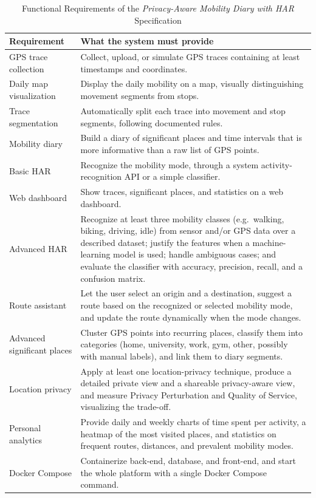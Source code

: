 \documentclass[conference,a4paper]{IEEEtran}
\begin{document}
\begin{table}[htbp]
\caption{Functional Requirements of the \textit{Privacy-Aware Mobility Diary with HAR} Specification}
\begin{center}
\begin{tabularx}{\textwidth}{p{} X}
\toprule
\textbf{Requirement} & \textbf{What the system must provide}\\
\midrule
GPS trace collection & Collect, upload, or simulate GPS traces containing at least timestamps and coordinates.\\
Daily map visualization & Display the daily mobility on a map, visually distinguishing movement segments from stops.\\
Trace segmentation & Automatically split each trace into movement and stop segments, following documented rules.\\
Mobility diary & Build a diary of significant places and time intervals that is more informative than a raw list of GPS points.\\
Basic HAR & Recognize the mobility mode, through a system activity-recognition API or a simple classifier.\\
Web dashboard & Show traces, significant places, and statistics on a web dashboard.\\
Advanced HAR & Recognize at least three mobility classes (e.g.\ walking, biking, driving, idle) from sensor and/or GPS data over a described dataset; justify the features when a machine-learning model is used; handle ambiguous cases; and evaluate the classifier with accuracy, precision, recall, and a confusion matrix.\\
Route assistant & Let the user select an origin and a destination, suggest a route based on the recognized or selected mobility mode, and update the route dynamically when the mode changes.\\
Advanced significant places & Cluster GPS points into recurring places, classify them into categories (home, university, work, gym, other, possibly with manual labels), and link them to diary segments.\\
Location privacy & Apply at least one location-privacy technique, produce a detailed private view and a shareable privacy-aware view, and measure Privacy Perturbation and Quality of Service, visualizing the trade-off.\\
Personal analytics & Provide daily and weekly charts of time spent per activity, a heatmap of the most visited places, and statistics on frequent routes, distances, and prevalent mobility modes.\\
Docker Compose & Containerize back-end, database, and front-end, and start the whole platform with a single Docker Compose command.\\
\bottomrule
\end{tabularx}
\label{tab:specmap}
\end{center}
\end{table}
\end{document}
